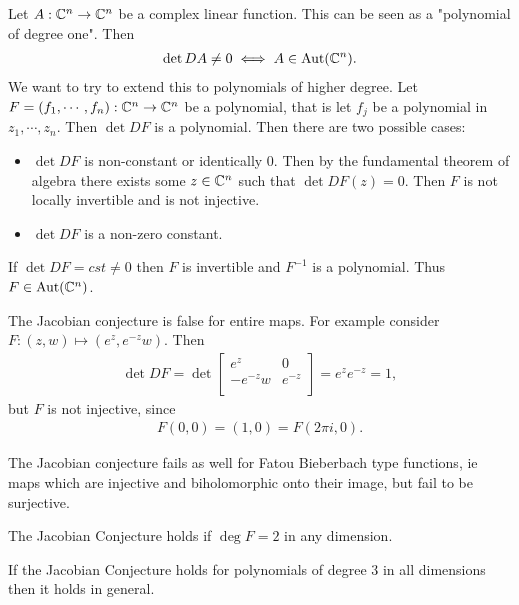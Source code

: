  Let $A: \mathbb{C}^n \to \mathbb{C}^n$ be a complex linear function. This can be seen as a "polynomial of degree one". Then
 \begin{align*}
     \det DA \neq 0 \iff A \in \operatorname{Aut} (\mathbb{C}^n).
 \end{align*}
We want to try to extend this to polynomials of higher degree. Let $F = (f_1 , \cdots, f_n) : \mathbb{C}^n \to \mathbb{C}^n$ be a polynomial, that is let $f_j$ be a polynomial in $z_1, \cdots, z_n$. Then $\det DF$ is a polynomial. Then there are two possible cases:
\begin{itemize}
    \item $\det DF$ is non-constant or identically $0$. Then by the fundamental theorem of algebra there exists some $z \in \mathbb{C}^n$ such that $\det DF(z) = 0$. Then $F$ is not locally invertible and is not injective.
    \item $\det DF$ is a non-zero constant.
\end{itemize}
\begin{conjecture}[Keller, 1939]
    If $\det DF = cst \neq 0$ then $F$ is invertible and $F^{-1}$ is a polynomial. Thus $F \in \operatorname{Aut} (\mathbb{C}^n)$.
\end{conjecture}

\begin{remark}
    The Jacobian conjecture is false for entire maps. For example consider $F: (z,w ) \mapsto (e^z , e^{-z}w) $. Then
    \begin{align*}
        \det DF = \det 
        \begin{bmatrix}
            e^z & 0\\
            -e^{-z}w & e^{-z}\\
        \end{bmatrix}
        = e^{z} e^{-z} = 1,
    \end{align*}
    but $F$ is not injective, since
    \begin{align*}
        F(0,0) = (1,0) = F(2 \pi i , 0).
    \end{align*}
\end{remark}

\begin{remark}
    The Jacobian conjecture fails as well for Fatou Bieberbach type functions, ie maps which are injective and biholomorphic onto their image, but fail to be surjective.
\end{remark}

\begin{remark}
    The Jacobian Conjecture holds if $\deg F = 2$ in any dimension.
\end{remark}
\begin{remark}
    If the Jacobian Conjecture holds for polynomials of degree $3$ in all dimensions then it holds in general.
\end{remark}

